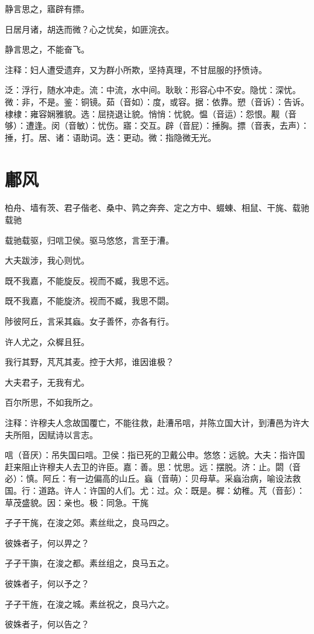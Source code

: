 \documentclass[12pt,UTF8]{ctexbook}
\begin{document}
静言思之，寤辟有摽。

日居月诸，胡迭而微？心之忧矣，如匪浣衣。

静言思之，不能奋飞。

注释：妇人遭受遗弃，又为群小所欺，坚持真理，不甘屈服的抒愤诗。

泛：浮行，随水冲走。流：中流，水中间。耿耿：形容心中不安。隐忧：深忧。微：非，不是。鉴：铜镜。茹（音如）：度，或容。据：依靠。愬（音诉）：告诉。棣棣：雍容娴雅貌。选：屈挠退让貌。悄悄：忧貌。愠（音运）：怨恨。觏（音够）：遭逢。闵（音敏）：忧伤。寤：交互。辟（音屁）：捶胸。摽（音表，去声）：捶，打。居、诸：语助词。迭：更动。微：指隐微无光。



\part{鄘风}
柏舟、墙有茨、君子偕老、桑中、鹑之奔奔、定之方中、蝃蝀、相鼠、干旄、载驰
载驰

载驰载驱，归唁卫侯。驱马悠悠，言至于漕。

大夫跋涉，我心则忧。

既不我嘉，不能旋反。视而不臧，我思不远。

既不我嘉，不能旋济。视而不臧，我思不閟。

陟彼阿丘，言采其蝱。女子善怀，亦各有行。

许人尤之，众樨且狂。

我行其野，芃芃其麦。控于大邦，谁因谁极？

大夫君子，无我有尤。

百尔所思，不如我所之。

注释：许穆夫人念故国覆亡，不能往救，赴漕吊唁，并陈立国大计，到漕邑为许大夫所阻，因赋诗以言志。

唁（音厌）：吊失国曰唁。卫侯：指已死的卫戴公申。悠悠：远貌。大夫：指许国赶来阻止许穆夫人去卫的许臣。嘉：善。思：忧思。远：摆脱。济：止。閟（音必）：慎。阿丘：有一边偏高的山丘。蝱（音萌）：贝母草。采蝱治病，喻设法救国。行：道路。许人：许国的人们。尤：过。众：既是。樨：幼稚。芃（音彭）：草茂盛貌。因：亲也。极：同急。干旄

孑孑干旄，在浚之郊。素丝纰之，良马四之。

彼姝者子，何以畀之？

孑孑干旟，在浚之都。素丝组之，良马五之。

彼姝者子，何以予之？

孑孑干旌，在浚之城。素丝祝之，良马六之。

彼姝者子，何以告之？
\end{document}
